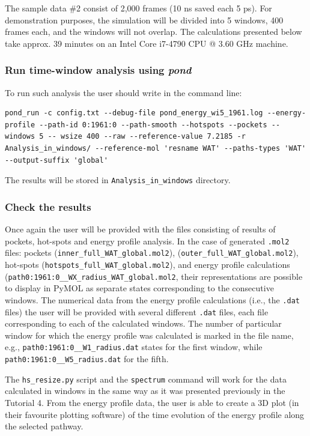 \documentclass[9pt,tutorial, pubversion]{livecoms}
\begin{document}
The sample data \#2 consist of 2,000 frames (10 ns saved each 5 ps). For demonstration purposes, the simulation will be divided into 5 windows, 400 frames each, and the windows will not overlap. The calculations presented below take approx. 39 minutes on an Intel Core i7-4790 CPU @ 3.60 GHz machine.

\subsubsection{Run time-window analysis using \emph{pond}}
To run such analysis the user should write in the command line:
\begin{lstlisting}
pond_run -c config.txt --debug-file pond_energy_wi5_1961.log --energy-profile --path-id 0:1961:0 --path-smooth --hotspots --pockets --windows 5 -- wsize 400 --raw --reference-value 7.2185 -r Analysis_in_windows/ --reference-mol 'resname WAT' --paths-types 'WAT' --output-suffix 'global'
\end{lstlisting}
The results will be stored in \texttt{Analysis\_in\_windows} directory.

\subsubsection{Check the results}
Once again the user will be provided with the files consisting of results of pockets, hot-spots and energy profile analysis. In the case of generated \texttt{.mol2} files: pockets (\texttt{inner\_full\_WAT\_global.mol2}), (\texttt{outer\_full\_WAT\_global.mol2}), \hfill hot-spots (\texttt{hotspots\_full\_WAT\_global.mol2}), \hfill and \newline energy profile calculations \newline (\texttt{path0:1961:0\_\_WX\_radius\_WAT\_global.mol2}, their representations are possible to display in PyMOL as separate states corresponding to the consecutive windows. The numerical data from the energy profile calculations (i.e., the \texttt{.dat} files) the user will be provided with several different \texttt{.dat} files, each file corresponding to each of the calculated windows. The number of particular window for which the energy profile was calculated is marked in the file name, e.g., \texttt{path0:1961:0\_\_W1\_radius.dat} states for the first window, while \texttt{path0:1961:0\_\_W5\_radius.dat} for the fifth.

The \texttt{hs\_resize.py} script and the \texttt{spectrum} command will work for the data calculated in windows in the same way as it was presented previously in the Tutorial 4. From the energy profile data, the user is able to create a 3D plot (in their favourite plotting software) of the time evolution of the energy profile along the selected pathway.
\end{document}
